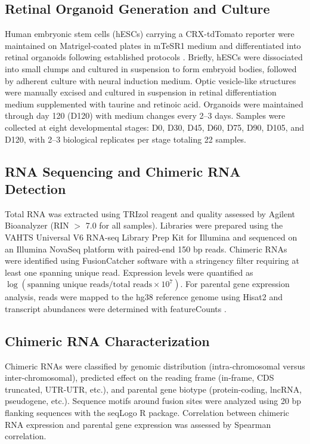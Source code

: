 \documentclass[12pt]{article}
\begin{document}
\subsection{Retinal Organoid Generation and Culture}

Human embryonic stem cells (hESCs) carrying a CRX-tdTomato reporter were maintained on Matrigel-coated plates in mTeSR1 medium and differentiated into retinal organoids following established protocols \citep{zhong2014generation}. Briefly, hESCs were dissociated into small clumps and cultured in suspension to form embryoid bodies, followed by adherent culture with neural induction medium. Optic vesicle-like structures were manually excised and cultured in suspension in retinal differentiation medium supplemented with taurine and retinoic acid. Organoids were maintained through day 120 (D120) with medium changes every 2--3 days. Samples were collected at eight developmental stages: D0, D30, D45, D60, D75, D90, D105, and D120, with 2--3 biological replicates per stage totaling 22 samples.

\subsection{RNA Sequencing and Chimeric RNA Detection}

Total RNA was extracted using TRIzol reagent and quality assessed by Agilent Bioanalyzer (RIN $>$ 7.0 for all samples). Libraries were prepared using the VAHTS Universal V6 RNA-seq Library Prep Kit for Illumina and sequenced on an Illumina NovaSeq platform with paired-end 150 bp reads. Chimeric RNAs were identified using FusionCatcher software \citep{nicorici2014fusioncatcher} with a stringency filter requiring at least one spanning unique read. Expression levels were quantified as $\log(\text{spanning unique reads} / \text{total reads} \times 10^7)$. For parental gene expression analysis, reads were mapped to the hg38 reference genome using Hisat2 \citep{kim2019graph} and transcript abundances were determined with featureCounts \citep{liao2014featurecounts}.

\subsection{Chimeric RNA Characterization}

Chimeric RNAs were classified by genomic distribution (intra-chromosomal versus inter-chromosomal), predicted effect on the reading frame (in-frame, CDS truncated, UTR-UTR, etc.), and parental gene biotype (protein-coding, lncRNA, pseudogene, etc.). Sequence motifs around fusion sites were analyzed using 20 bp flanking sequences with the seqLogo R package. Correlation between chimeric RNA expression and parental gene expression was assessed by Spearman correlation.
\end{document}
